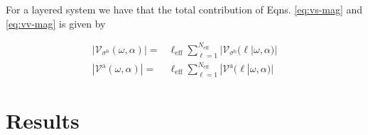 \documentclass[prb,11pt,tightenlines,twocolumn,aps]{revtex4-1}
\begin{document}
For a layered system we have that the total contribution of Eqns. 
\eqref{eq:vs-mag} and \eqref{eq:vv-mag} is given \cite{arzatePRB14} by 

\begin{align}
|\mathcal{V}_{\sigma^{\mathrm{b}}}(\omega,\alpha)|
=& 
\ell_{\mathrm{eff}}
\sum_{\ell=1}^{N_{\mathrm{eff}}}
|\mathcal{V}_{\sigma^{\mathrm{b}}} (\ell | \omega,\alpha)|
\label{eq:vs-layer}
\\
|\mathcal{V}^{\mathrm{a}}(\omega,\alpha)|
=&
\ell_{\mathrm{eff}}
\sum_{\ell=1}^{N_{\mathrm{eff}}}
|\mathcal{V}^{\mathrm{a}} (\ell | \omega,\alpha)|
\label{eq:vv-layer}
\end{align}



\section{Results} %
\label{sec:results}
\end{document}
